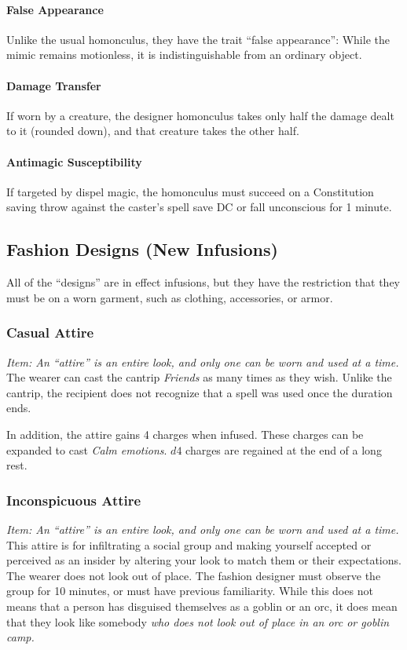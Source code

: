 \documentclass[twocolumn]{dndbook}
\begin{document}
\paragraph{False Appearance}
Unlike the usual homonculus, they have the trait ``false appearance'':
While the mimic remains motionless, it is indistinguishable from an ordinary object.

\paragraph{Damage Transfer}
If worn by a creature, the designer homonculus takes only half the damage dealt to it (rounded down), and that creature takes the other half.

\paragraph{Antimagic Susceptibility}
If targeted by dispel magic, the homonculus must succeed on a Constitution saving throw against the caster's spell save DC or fall unconscious for 1 minute.


\subsection{Fashion Designs (New Infusions)}

All of the ``designs'' are in effect infusions, but they have the restriction that they must be on a worn garment, such as clothing, accessories, or armor.\par

\subsubsection{Casual Attire}
\emph{Item: An ``attire'' is an entire look, and only one can be worn and used at a time.}
The wearer can cast the cantrip \emph{Friends} as many times as they wish.
Unlike the cantrip, the recipient does not recognize that a spell was used once the duration ends.\par

In addition, the attire gains 4 charges when infused.
These charges can be expanded to cast \emph{Calm emotions}.
$d4$ charges are regained at the end of a long rest.

\subsubsection{Inconspicuous Attire}
\emph{Item: An ``attire'' is an entire look, and only one can be worn and used at a time.}
This attire is for infiltrating a social group and making yourself accepted or perceived as an insider by altering your look to match them or their expectations.
The wearer does not look out of place.
The fashion designer must observe the group for 10 minutes, or must have previous familiarity.
While this does not means that a person has disguised themselves as a goblin or an orc,
it does mean that they look like somebody \emph{who does not look out of place in an orc or goblin camp.}
\end{document}
